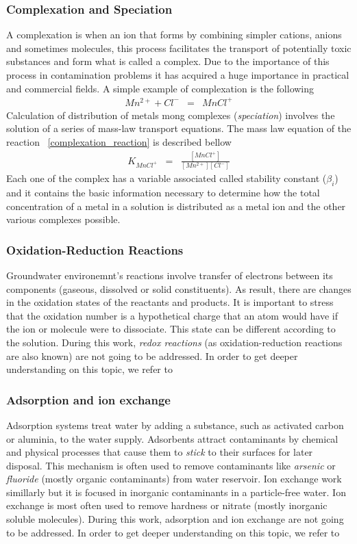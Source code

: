 \documentclass[ppgc,mestrado,english]{iiufrgs}
\begin{document}
\subsubsection{Complexation and Speciation}
A complexation is when an ion that forms by combining simpler cations, anions and sometimes molecules, this process facilitates the transport of potentially toxic substances and form what is called a complex. Due to the importance of this process in contamination problems it has acquired a huge importance in practical and commercial fields. A simple example of complexation is the following
\begin{eqnarray}\label{complexation_reaction}
Mn^{2+} + Cl^- &=& MnCl^+
\end{eqnarray}
Calculation of distribution of metals mong complexes (\emph{speciation}) involves the solution of a series of mass-law transport equations. The mass law equation of the reaction ~\ref{complexation_reaction} is described bellow
\begin{eqnarray}
K_{MnCl^+} &=& \frac{[MnCl^+]}{[Mn^{2+}][Cl^-]}
\end{eqnarray}
Each one of the complex has a variable associated called stability constant ($\beta_i$)  and it contains the basic information necessary to determine how the total concentration of a metal in a solution is distributed as a metal ion and the other various complexes possible. 

\subsubsection{Oxidation-Reduction Reactions}
Groundwater environemnt's reactions involve transfer of electrons between its components (gaseous, dissolved or solid constituents). As result, there are changes in the oxidation states of the reactants and products. It is important to stress that the oxidation number is a hypothetical charge that an atom would have if the ion or molecule were to dissociate. This state can be different according to the solution. 
During this work, \emph{redox reactions} (as oxidation-reduction reactions are also known) are not going to be addressed. In order to get deeper understanding on this topic, we refer to \cite{Petrucci:07}

\subsubsection{Adsorption and ion exchange}
Adsorption systems treat water by adding a substance, such as activated carbon or aluminia, to the water supply. Adsorbents attract contaminants by chemical and physical processes that cause them to \emph{stick} to their surfaces for later disposal. This mechanism is often used to remove contaminants like \emph{arsenic} or \emph{fluoride} (mostly organic contaminants) from water reservoir.
Ion exchange work simillarly but it is focused in inorganic contaminants in a particle-free water. Ion exchange is most often used to remove hardness or nitrate (mostly inorganic soluble molecules). 
During this work, adsorption and ion exchange are not going to be addressed. In order to get deeper understanding on this topic, we refer to \cite{Freeze:79}
\end{document}
